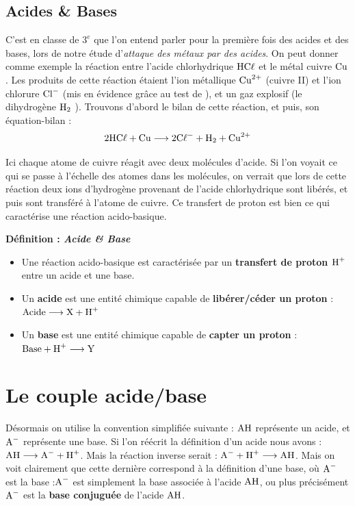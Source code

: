 \documentclass[11pt,a4paper]{article}
\newcommand{\To}{\longrightarrow}
\newenvironment{defn}[1]
 {\begin{leftbar}\noindent \textbf{Définition :\textit{ \quad #1}} } { \end{leftbar}}
\begin{document}
\subsection*{Acides \& Bases}	

C’est en classe de $3^e$ que l’on entend parler pour la première fois des acides et des bases, lors de notre étude d’\textit{attaque des métaux par des acides}. 
On peut donner comme exemple la réaction entre l’acide chlorhydrique $\ce{HC\ell}$ et le métal cuivre $\ce{Cu}$.  Les produits de cette réaction étaient l’ion métallique $\ce{Cu^2+}$ (cuivre II) et l’ion chlorure $\ce{Cl-}$ (mis en évidence grâce au test de ), et un gaz explosif (le dihydrogène $\ce{H2}$  ).  Trouvons d’abord le bilan de cette réaction, et puis, son équation-bilan : $$2\ce{HC\ell} + \ce{Cu} \To 2\ce{C\ell-} + \ce{H2} + \ce{Cu^2+} $$

Ici chaque atome de cuivre réagit avec deux molécules d’acide.  Si l'on voyait ce qui se passe à l'échelle des atomes dans les molécules, on verrait que lors de cette réaction deux ions d'hydrogène provenant de l’acide chlorhydrique sont libérés, et puis sont transféré à l'atome de cuivre.  Ce transfert de proton est bien ce qui caractérise une réaction acido-basique. 

\begin{defn}{Acide \& Base}
\begin{itemize}
    \item Une réaction acido-basique est caractérisée par un \textbf{transfert de proton $\ce{H+}$} entre un acide et une base.
    \item Un \textbf{acide} est une entité chimique capable de \textbf{libérer/céder un proton}  : $\ce{Acide} \To \ce{X} + \ce{H+}$
    \item Un \textbf{base} est une entité chimique capable de \textbf{capter un proton}  : $\ce{Base} + \ce{H+} \To \ce{Y}$
\end{itemize}    
\end{defn}

\section*{Le couple acide/base}

Désormais on utilise la convention simplifiée suivante : $\ce{AH}$ représente un acide, et $\ce{A-}$ représente une base.  Si l'on réécrit la définition d'un acide nous avons : $\ce{AH} \To \ce{A-} + \ce{H+}$. 
Mais la réaction inverse serait :   $\ce{A-} + \ce{H+} \To \ce{AH}$. Mais on voit clairement que cette dernière correspond à la définition d’une base, où $ \ce{A-}$ est la base :$\ce{A-}$ est simplement la base associée à l’acide $\ce{AH}$, ou plus précisément $\ce{A-}$  est la \textbf{base conjuguée} de l’acide $\ce{AH}$.  
\end{document}
